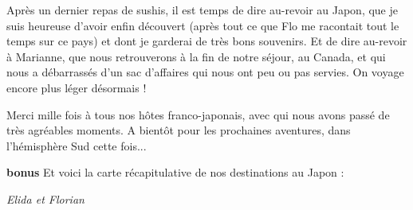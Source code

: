Après un dernier repas de sushis, il est temps de dire au-revoir au
Japon, que je suis heureuse d'avoir enfin découvert (après tout ce que
Flo me racontait tout le temps sur ce pays) et dont je garderai de très
bons souvenirs. Et de dire au-revoir à Marianne, que nous retrouverons à
la fin de notre séjour, au Canada, et qui nous a débarrassés d'un sac
d'affaires qui nous ont peu ou pas servies. On voyage encore plus léger
désormais !

Merci mille fois à tous nos hôtes franco-japonais, avec qui nous avons
passé de très agréables moments. A bientôt pour les prochaines
aventures, dans l'hémisphère Sud cette fois...

\textbf{bonus} Et voici la carte récapitulative de nos destinations au
Japon :

\hypertarget{mapid}{}

\emph{Elida et Florian}
